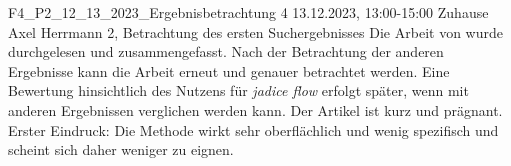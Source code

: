 \fieldnote
{F4\_P2\_12\_13\_2023\_Ergebnisbetrachtung}
{4}
{13.12.2023, 13:00-15:00}
{Zuhause}
{Axel Herrmann}
{2, Betrachtung des ersten Suchergebnisses}
{
	Die Arbeit von  wurde durchgelesen und zusammengefasst.
}
{
	Nach der Betrachtung der anderen Ergebnisse kann die Arbeit erneut und genauer betrachtet werden.
	Eine Bewertung hinsichtlich des Nutzens für \emph{jadice flow} erfolgt später, wenn mit anderen Ergebnissen verglichen werden kann. 
}
{
	Der Artikel ist kurz und prägnant.
}
{}
{
	Erster Eindruck: Die Methode wirkt sehr oberflächlich und wenig spezifisch und scheint sich daher weniger zu eignen.
}
